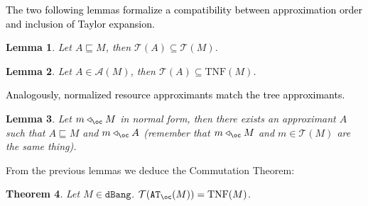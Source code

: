 \documentclass[10pt,a4paper]{article}
\newtheorem{theorem}{Theorem}
\newtheorem{lemma}[theorem]{Lemma}
\newcommand{\<}{\langle}
\renewcommand{\>}{\rangle}
\newcommand{\dbang}{\ensuremath{\mathtt{dBang}}}
\newcommand{\app}{\triangleleft_\oc} %
\newcommand{\mcal}[1]{\ensuremath{\mathcal{#1}}}
\newcommand{\setApprox}{\mcal{A}}
\newcommand{\setapprox}{\setApprox}
\newcommand{\taylor}[1]{\ensuremath{\mathcal{T}(#1)}}
\newcommand{\taylornf}[1]{\ensuremath{\text{TNF}(#1)}}
\newcommand{\btb}{\ensuremath{{\tt{AT}_\oc}}}
\newcommand{\smaller}{\ensuremath{\sqsubseteq}}
\newcommand{\fnl}[1]{\textcolor{black}{#1}}
\begin{document}
\fnl{The two following lemmas formalize a compatibility between approximation order
and inclusion of Taylor expansion.}

\begin{lemma}\label{lem:approx-taylor-subset}
	Let $A\smaller M$, then $\taylor A\subseteq\taylor M$.
\end{lemma}

\begin{lemma}\label{lem:approx_subset_nft}
	Let $A\in\setapprox(M)$, then $\taylor A\subseteq\taylornf M$.
\end{lemma}

\fnl{Analogously, normalized resource approximants match the tree approximants.}

\begin{lemma}
	\label{lem:taylor-bohm:nf-imply-in-approx}
	Let $m\app M$ in normal form, then there exists an approximant $A$ such that
	$A\smaller M$ and $m \app A$
	(remember that $m\app M$ and $m\in\taylor M$ are the same thing).
\end{lemma}


From the previous lemmas we deduce the Commutation Theorem:

\begin{theorem}
	\label{thm:taylor-bohm-commute}
	Let $M\in\dbang$. $\taylor{ \btb(M)} =\taylornf M$.
\end{theorem}
\end{document}
